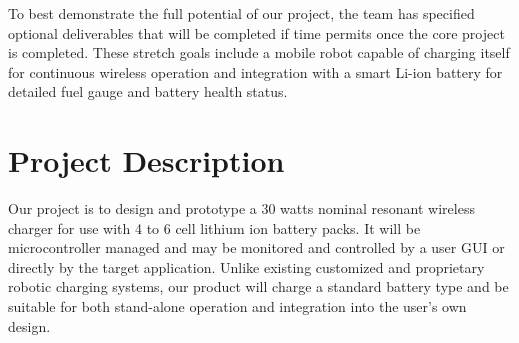 \documentclass[12pt]{article}
\begin{document}
To best demonstrate the full potential of our project, the team has specified optional deliverables that will be completed if time permits once the core project is completed. These stretch goals include a mobile robot capable of charging itself for continuous wireless operation and integration with a smart Li-ion battery for detailed fuel gauge and battery health status.\\

\pagebreak

\tableofcontents

\pagebreak

\listoffigures

\pagebreak

\listoftables

\pagebreak










\section{Project Description}
\indent \indent
Our project is to design and prototype a 30 watts nominal resonant wireless charger for use with 4 to 6 cell lithium ion battery packs. It will be microcontroller managed and may be monitored and controlled by a user GUI or directly by the target application. Unlike existing customized and proprietary robotic charging systems, our product will charge a standard battery type and be suitable for both stand-alone operation and integration into the user's own design.\\ \indent
\end{document}
